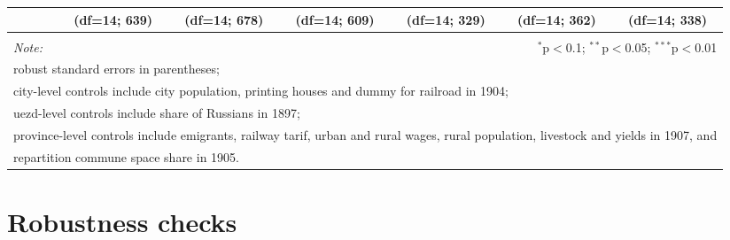\documentclass[a4paper, 12pt]{article}
\begin{document}
\begin{table}[!htbp]
{\begin{tabular}{@{\extracolsep{5pt}}lcccccc}
&  (df=14; 639) & (df=14; 678) &  (df=14; 609) &  (df=14; 329) &  (df=14; 362) &  (df=14; 338) \\ 
\hline 
\hline \\[-1.8ex] 
\textit{Note:}  & \multicolumn{6}{r}{$^{*}$p$<$0.1; $^{**}$p$<$0.05; $^{***}$p$<$0.01} \\ \multicolumn{7}{l}{robust standard errors in parentheses;} \\
\multicolumn{7}{l}{city-level controls include city population, printing houses and dummy for railroad in 1904;} \\
\multicolumn{7}{l}{uezd-level controls include share of Russians in 1897;}\\
\multicolumn{7}{l}{province-level controls include emigrants, railway tarif, urban and rural wages, rural population, livestock and yields in 1907, and }\\
\multicolumn{7}{l}{repartition commune space share in 1905.}
\end{tabular}
}
\end{table} 

\section{Robustness checks}
\end{document}
